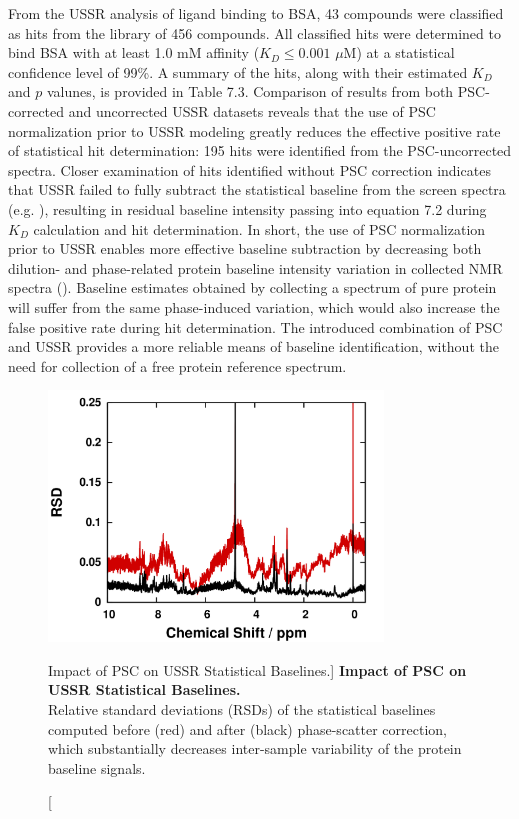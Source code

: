 \begin{doublespace}
From the USSR analysis of ligand binding to BSA, 43 compounds were classified
as hits from the library of 456 compounds. All classified hits were determined
to bind BSA with at least 1.0 mM affinity ($K_D \le 0.001$ $\mu$M) at a
statistical confidence level of 99\%. A summary of the hits, along with their
estimated $K_D$ and $p$ valunes, is provided in Table 7.3. Comparison of
results from both PSC-corrected and uncorrected USSR datasets reveals that the
use of PSC normalization prior to USSR modeling greatly reduces the effective
positive rate of statistical hit determination: 195 hits were identified from
the PSC-uncorrected spectra. Closer examination of hits identified without PSC
correction indicates that USSR failed to fully subtract the statistical
baseline from the screen spectra (e.g. ), resulting
in residual baseline intensity passing into equation 7.2 during $K_D$
calculation and hit determination. In short, the use of PSC normalization
prior to USSR enables more effective baseline subtraction by decreasing
both dilution- and phase-related protein baseline intensity variation in
collected \hnmr{} NMR spectra (). Baseline estimates
obtained by collecting a spectrum of pure protein will suffer from the same
phase-induced variation, which would also increase the false positive rate
during hit determination. The introduced combination of PSC and USSR
provides a more reliable means of baseline identification, without
the need for collection of a free protein reference spectrum.
\end{doublespace}

\begin{figure}
\includegraphics[width=3.5in]{figs/ussr/05-rsd.png}
\caption
      [Impact of PSC on USSR Statistical Baselines.]{
  {\bf Impact of PSC on USSR Statistical Baselines.}
  \\
  Relative standard deviations (RSDs) of the statistical baselines computed
  before (red) and after (black) phase-scatter correction, which substantially
  decreases inter-sample variability of the protein baseline signals.
}
\label{figure.7.5}
\end{figure}

